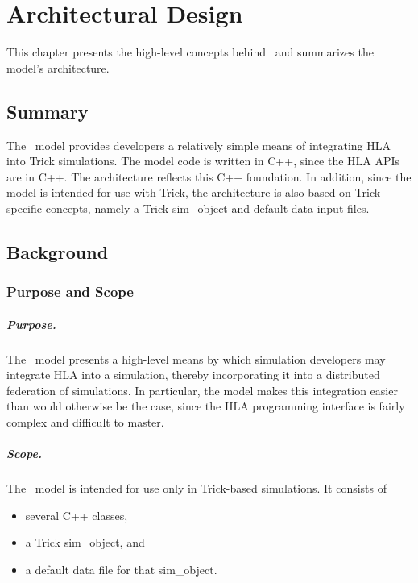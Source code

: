 %
%
%

\chapter{Architectural Design}\label{sec:architectural_design}

This chapter presents the high-level concepts behind \TrickHLA\ and
summarizes the model's architecture.

\section{Summary}

The \TrickHLA\ model provides developers a
relatively simple means of integrating HLA into Trick simulations.
The model code is written in C++, since the HLA APIs are in C++.
The architecture reflects this C++ foundation.
In addition, since the model is intended for use with Trick,
the architecture is also based on Trick-specific concepts, namely a
Trick {\ttfamily sim\_object} and default data input files.

\section{Background}

\subsection{Purpose and Scope}
\paragraph{Purpose.}
The \TrickHLA\ model presents a high-level means by which simulation
developers may integrate HLA into a simulation, thereby incorporating
it into a distributed federation of simulations.
In particular, the model makes this integration easier than would
otherwise be the case, since the HLA programming interface is fairly
complex and difficult to master.

\paragraph{Scope.}
The \TrickHLA\ model is intended for use only in Trick-based simulations.
It consists of
\begin{itemize}
  \item{several C++ classes,}
  \item{a Trick {\ttfamily sim\_object}, and}
  \item{a default data file for that {\ttfamily sim\_object}.}
\end{itemize}

